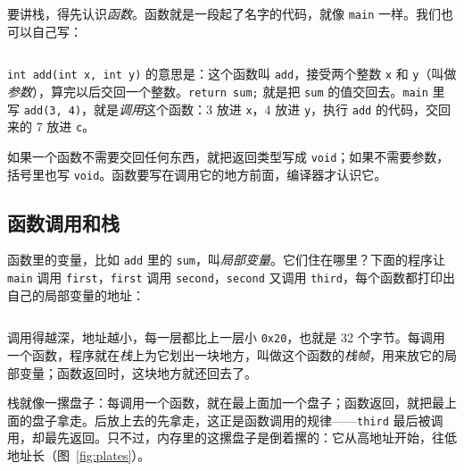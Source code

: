 要讲栈，得先认识\emph{函数}。函数就是一段起了名字的代码，就像 \texttt{main} 一样。我们也可以自己写：


\inputminted[linenos=false]{text}{code/ch04/out/func.txt}

\texttt{int add(int x, int y)} 的意思是：这个函数叫 \texttt{add}，接受两个整数 \texttt{x} 和 \texttt{y}（叫做\emph{参数}），算完以后交回一个整数。\texttt{return sum;} 就是把 \texttt{sum} 的值交回去。\texttt{main} 里写 \texttt{add(3, 4)}，就是\emph{调用}这个函数：3 放进 \texttt{x}，4 放进 \texttt{y}，执行 \texttt{add} 的代码，交回来的 7 放进 \texttt{c}。

如果一个函数不需要交回任何东西，就把返回类型写成 \texttt{void}；如果不需要参数，括号里也写 \texttt{void}。函数要写在调用它的地方前面，编译器才认识它。

\subsection{函数调用和栈}

函数里的变量，比如 \texttt{add} 里的 \texttt{sum}，叫\emph{局部变量}。它们住在哪里？下面的程序让 \texttt{main} 调用 \texttt{first}，\texttt{first} 调用 \texttt{second}，\texttt{second} 又调用 \texttt{third}，每个函数都打印出自己的局部变量的地址：


\inputminted[linenos=false]{text}{code/ch04/out/stack.txt}

调用得越深，地址越小，每一层都比上一层小 \texttt{0x20}，也就是 32 个字节。每调用一个函数，程序就在\emph{栈}上为它划出一块地方，叫做这个函数的\emph{栈帧}，用来放它的局部变量；函数返回时，这块地方就还回去了。

栈就像一摞盘子：每调用一个函数，就在最上面加一个盘子；函数返回，就把最上面的盘子拿走。后放上去的先拿走，这正是函数调用的规律——\texttt{third} 最后被调用，却最先返回。只不过，内存里的这摞盘子是倒着摞的：它从高地址开始，往低地址长（图~\ref{fig:plates}）。

